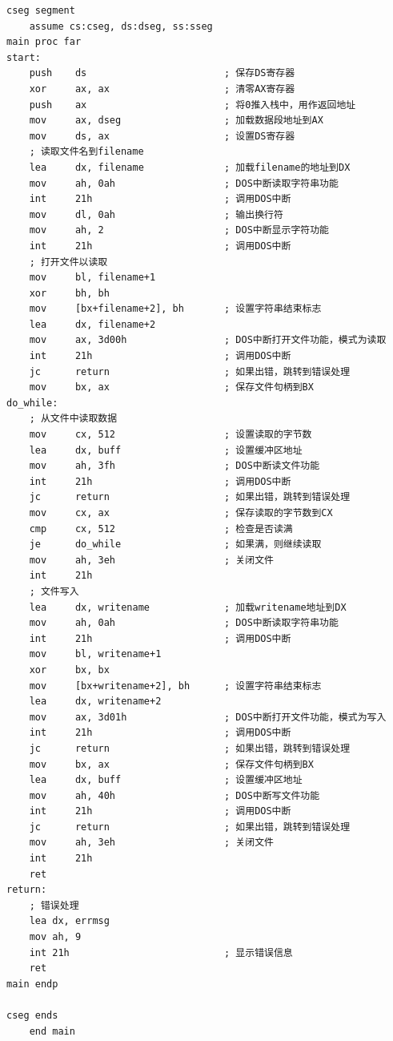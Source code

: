 \documentclass[12pt]{article}
\begin{document}
\begin{lstlisting}[caption={汇编源代码}, label=lst:asm2]
cseg segment
    assume cs:cseg, ds:dseg, ss:sseg
main proc far
start:
    push    ds                        ; 保存DS寄存器
    xor     ax, ax                    ; 清零AX寄存器
    push    ax                        ; 将0推入栈中，用作返回地址
    mov     ax, dseg                  ; 加载数据段地址到AX
    mov     ds, ax                    ; 设置DS寄存器
    ; 读取文件名到filename
    lea     dx, filename              ; 加载filename的地址到DX
    mov     ah, 0ah                   ; DOS中断读取字符串功能
    int     21h                       ; 调用DOS中断
    mov     dl, 0ah                   ; 输出换行符
    mov     ah, 2                     ; DOS中断显示字符功能
    int     21h                       ; 调用DOS中断
    ; 打开文件以读取
    mov     bl, filename+1
    xor     bh, bh
    mov     [bx+filename+2], bh       ; 设置字符串结束标志
    lea     dx, filename+2
    mov     ax, 3d00h                 ; DOS中断打开文件功能，模式为读取
    int     21h                       ; 调用DOS中断
    jc      return                    ; 如果出错，跳转到错误处理
    mov     bx, ax                    ; 保存文件句柄到BX
do_while:
    ; 从文件中读取数据
    mov     cx, 512                   ; 设置读取的字节数
    lea     dx, buff                  ; 设置缓冲区地址
    mov     ah, 3fh                   ; DOS中断读文件功能
    int     21h                       ; 调用DOS中断
    jc      return                    ; 如果出错，跳转到错误处理
    mov     cx, ax                    ; 保存读取的字节数到CX
    cmp     cx, 512                   ; 检查是否读满
    je      do_while                  ; 如果满，则继续读取
    mov     ah, 3eh                   ; 关闭文件
    int     21h
    ; 文件写入
    lea     dx, writename             ; 加载writename地址到DX
    mov     ah, 0ah                   ; DOS中断读取字符串功能
    int     21h                       ; 调用DOS中断
    mov     bl, writename+1
    xor     bx, bx
    mov     [bx+writename+2], bh      ; 设置字符串结束标志
    lea     dx, writename+2
    mov     ax, 3d01h                 ; DOS中断打开文件功能，模式为写入
    int     21h                       ; 调用DOS中断
    jc      return                    ; 如果出错，跳转到错误处理
    mov     bx, ax                    ; 保存文件句柄到BX
    lea     dx, buff                  ; 设置缓冲区地址
    mov     ah, 40h                   ; DOS中断写文件功能
    int     21h                       ; 调用DOS中断
    jc      return                    ; 如果出错，跳转到错误处理
    mov     ah, 3eh                   ; 关闭文件
    int     21h
    ret
return:
    ; 错误处理
    lea dx, errmsg
    mov ah, 9
    int 21h                           ; 显示错误信息
    ret
main endp

cseg ends
    end main
    \end{lstlisting}
\end{document}
